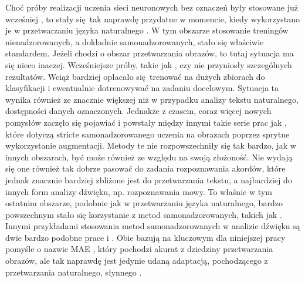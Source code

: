 Choć próby realizacji uczenia sieci neuronowych bez oznaczeń były stosowane już wcześniej \cite{noroozi_unsupervised_2017}, to stały się tak naprawdę przydatne w momencie, kiedy wykorzystano je w przetwarzaniu języka naturalnego \cite{devlin_bert_2019}. W tym obszarze stosowanie treningów nienadzorowanych, a dokładnie samonadzorowanych, stało się właściwie standardem. Jeżeli chodzi o obszar przetwarzania obrazów, to tutaj sytuacja ma się nieco inaczej. Wcześniejsze próby, takie jak \cite{pathak_context_2016}, czy \cite{noroozi_unsupervised_2017} nie przyniosły szczególnych rezultatów. Wciąż bardziej opłacało się trenować na dużych zbiorach do klasyfikacji i ewentualnie dotrenowywać na zadaniu docelowym. Sytuacja ta wynika również ze znacznie większej niż w przypadku analizy tekstu naturalnego, dostępności danych oznaczonych. Jednakże z czasem, coraz więcej nowych pomysłów zaczęło się pojawiać i powstały między innymi takie serie prac jak \cite{chen_simple_2020, grill_bootstrap_2020, caron_unsupervised_2021, caron_emerging_2021}, które dotyczą stricte samonadzorowanego uczenia na obrazach poprzez sprytne wykorzystanie augmentacji. Metody te nie rozpowszechniły się tak bardzo, jak w innych obszarach, być może również ze względu na swoją złożoność. Nie wydają się one również tak dobrze pasować do zadania rozpoznawania akordów, które jednak znacznie bardziej zbliżone jest do przetwarzania tekstu, a najbardziej do innych form analizy dźwięku, np. rozpoznawania mowy. To właśnie w tym ostatnim obszarze, podobnie jak w przetwarzaniu języka naturalnego, bardzo powszechnym stało się korzystanie z metod samonadzorowanych, takich jak \cite{baevski_wav2vec_2020}. Innymi przykładami stosowania metod samonadzorowanych w analizie dźwięku są dwie bardzo podobne prace \cite{baade_mae-ast_2022} i \cite{he_masked_2021}. Obie bazują na kluczowym dla niniejszej pracy pomyśle o nazwie MAE \cite{he_masked_2021}, który pochodzi akurat z dziedziny przetwarzania obrazów, ale tak naprawdę jest jedynie udaną adaptacją, pochodzącego z przetwarzania naturalnego, słynnego \cite{devlin_bert_2019}.

